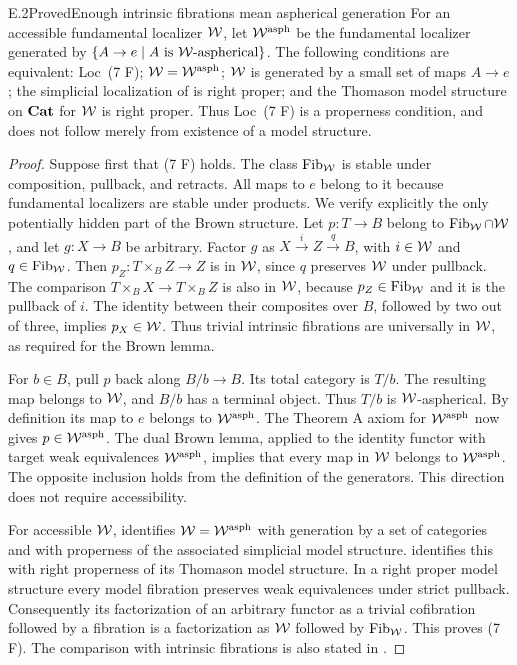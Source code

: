\begin{claim}{E.2}{Proved}{Enough intrinsic fibrations mean aspherical generation}
For an accessible fundamental localizer $\mathcal{W}$, let $\mathcal{W}^{\mathrm{asph}}$
be the fundamental localizer generated by
$\{A\to e\mid A\text{ is }\mathcal{W}\text{-aspherical}\}$.
The following conditions are equivalent: Loc~(7 F);
$\mathcal{W}=\mathcal{W}^{\mathrm{asph}}$; $\mathcal{W}$ is generated by a small set of
maps $A\to e$; the simplicial localization of  is
right proper; and the Thomason model structure on $\mathbf{Cat}$ for
$\mathcal{W}$ is right proper. Thus Loc~(7 F) is a properness condition,
and does not follow merely from existence of a model structure.
\end{claim}
\begin{proof}
Suppose first that (7 F) holds. The class $\operatorname{Fib}_{\mathcal{W}}$ is stable
under composition, pullback, and retracts. All maps to $e$ belong
to it because fundamental localizers are stable under products.
We verify explicitly the only potentially hidden part of the
Brown structure. Let $p:T\to B$ belong to $\operatorname{Fib}_{\mathcal{W}}\cap\mathcal{W}$,
and let $g:X\to B$ be arbitrary. Factor $g$ as
$X\xrightarrow{i}Z\xrightarrow{q}B$, with $i\in\mathcal{W}$ and
$q\in\operatorname{Fib}_{\mathcal{W}}$. Then
$p_Z:T\times_BZ\to Z$ is in $\mathcal{W}$, since $q$ preserves
$\mathcal{W}$ under pullback. The comparison
$T\times_BX\to T\times_BZ$ is also in $\mathcal{W}$, because
$p_Z\in\operatorname{Fib}_{\mathcal{W}}$ and it is the pullback of $i$.
The identity between their composites over $B$, followed by
two out of three, implies $p_X\in\mathcal{W}$. Thus trivial intrinsic
fibrations are universally in $\mathcal{W}$, as required for the Brown
lemma.

For $b\in B$, pull $p$ back along $B/b\to B$. Its total
category is $T/b$. The resulting map belongs to $\mathcal{W}$, and
$B/b$ has a terminal object. Thus $T/b$ is $\mathcal{W}$-aspherical.
By definition its map to $e$ belongs to
$\mathcal{W}^{\mathrm{asph}}$. The Theorem A axiom for
$\mathcal{W}^{\mathrm{asph}}$ now gives $p\in\mathcal{W}^{\mathrm{asph}}$.
The dual Brown lemma, applied to the identity functor with
target weak equivalences $\mathcal{W}^{\mathrm{asph}}$, implies that
every map in $\mathcal{W}$ belongs to $\mathcal{W}^{\mathrm{asph}}$.
The opposite inclusion holds from the definition of the
generators. This direction does not require accessibility.

For accessible $\mathcal{W}$, \citet[Theorem 6.1.11]{RootCisinski2006}
identifies $\mathcal{W}=\mathcal{W}^{\mathrm{asph}}$ with generation by a set
of categories and with properness of the associated simplicial
model structure. \citet[Theorem 5.2.15]{RootCisinski2006} identifies
this with right properness of its Thomason model structure.
In a right proper model structure every model fibration
preserves weak equivalences under strict pullback. Consequently
its factorization of an arbitrary functor as a trivial
cofibration followed by a fibration is a factorization as
$\mathcal{W}$ followed by $\operatorname{Fib}_{\mathcal{W}}$. This proves (7 F). The comparison
with intrinsic fibrations is also stated in
\citet[Example 6.1.14]{RootCisinski2006}.
\end{proof}

